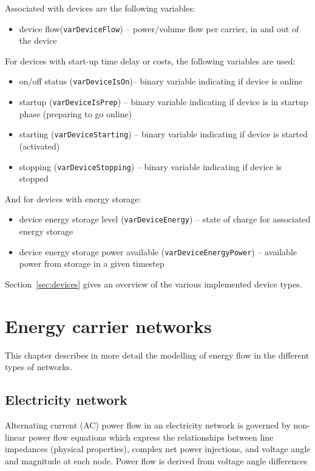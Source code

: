 \documentclass[12pt]{article}
\begin{document}
Associated with devices are the following variables:
\begin{itemize}
	\item device flow(\texttt{varDeviceFlow}) – power/volume flow per carrier, in and out of the device
\end{itemize}
%
For devices with start-up time delay or costs, the following variables are used:
\begin{itemize}
	\item on/off status (\texttt{varDeviceIsOn})– binary variable indicating if device is online
	\item startup (\texttt{varDeviceIsPrep}) – binary variable indicating if device is in startup phase (preparing to go online)
	\item starting (\texttt{varDeviceStarting}) – binary variable indicating if device is started (activated)
	\item stopping (\texttt{varDeviceStopping}) – binary variable indicating if device is stopped
\end{itemize}
%
And for devices with energy storage:
\begin{itemize}
	\item device energy storage level (\texttt{varDeviceEnergy}) – state of charge for associated energy storage
	\item device energy storage power available (\texttt{varDeviceEnergyPower}) – available power from storage in a given timestep
\end{itemize}


Section~\ref{sec:devices} gives an overview of the various implemented device types.





\section{Energy carrier networks}
\label{sec:networks}

This chapter describes in more detail the modelling of energy flow in the different types of networks.


\subsection{Electricity network}

Alternating current (AC) power flow in an electricity network is governed by non-linear power flow equations which express the relationships between line impedances (physical properties), complex net power injections, and voltage angle and magnitude at each node. Power flow is derived from voltage angle differences
\end{document}
